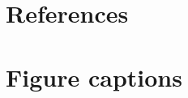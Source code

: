 \documentclass[utf8]{frontiersSCNS} %
\begin{document}
\section*{References}



\section*{Figure captions}


%
%

\end{document}
